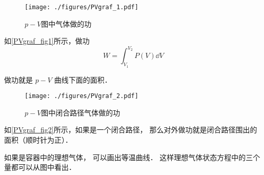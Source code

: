 

\begin{figure}[ht]
\centering
\texttt{[image: ./figures/PVgraf\_1.pdf]}
\caption{$p-V$图中气体做的功} \label{PVgraf_fig1}
\end{figure}

如\autoref{PVgraf_fig1}所示，做功
\begin{equation}\label{PVgraf_eq1}
W = \int_{V_1}^{V_2}P(V) \dd{V}
\end{equation}

做功就是 $p-V$ 曲线下面的面积． 

\begin{figure}[ht]  
\centering
\texttt{[image: ./figures/PVgraf\_2.pdf]}
\caption{$p-V$图中闭合路径气体做的功} \label{PVgraf_fig2}
\end{figure}

如\autoref{PVgraf_fig2}所示，如果是一个闭合路径， 那么对外做功就是闭合路径围出的面积（顺时针为正）．

如果是容器中的理想气体， 可以画出等温曲线． 这样理想气体状态方程中的三个量都可以从图中看出．
  